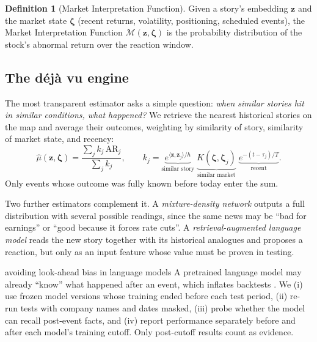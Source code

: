 \documentclass[11pt,a4paper]{article}
\theoremstyle{plain}
\theoremstyle{definition}
\newtheorem{definition}{Definition}
\newcommand{\z}{\bm{z}}
\begin{document}
\begin{definition}[Market Interpretation Function]
Given a story's embedding $\z$ and the market state $\bm\zeta$ (recent returns, volatility, positioning, scheduled events), the Market Interpretation Function $\mathcal{M}(\z,\bm\zeta)$ is the probability distribution of the stock's abnormal return over the reaction window.
\end{definition}

\subsection{The d\'ej\`a vu engine}

The most transparent estimator asks a simple question: \emph{when similar stories hit in similar conditions, what happened?} We retrieve the nearest historical stories on the map and average their outcomes, weighting by similarity of story, similarity of market state, and recency:
\begin{equation}
  \hat\mu(\z,\bm\zeta) = \frac{\sum_j k_j\,\mathrm{AR}_j}{\sum_j k_j}, \qquad
  k_j = \underbrace{e^{\langle\z,\z_j\rangle/h}}_{\text{similar story}}\;
        \underbrace{K(\bm\zeta,\bm\zeta_j)}_{\text{similar market}}\;
        \underbrace{e^{-(t-\tau_j)/T}}_{\text{recent}} .
\end{equation}
Only events whose outcome was fully known before today enter the sum.

Two further estimators complement it. A \emph{mixture-density network} outputs a full distribution with several possible readings, since the same news may be ``bad for earnings'' or ``good because it forces rate cuts''. A \emph{retrieval-augmented language model} reads the new story together with its historical analogues and proposes a reaction, but only as an input feature whose value must be proven in testing.

\begin{techbox}{avoiding look-ahead bias in language models}
A pretrained language model may already ``know'' what happened after an event, which inflates backtests \citep{glasserman2023}. We (i) use frozen model versions whose training ended before each test period, (ii) re-run tests with company names and dates masked, (iii) probe whether the model can recall post-event facts, and (iv) report performance separately before and after each model's training cutoff. Only post-cutoff results count as evidence.
\end{techbox}

\end{document}

